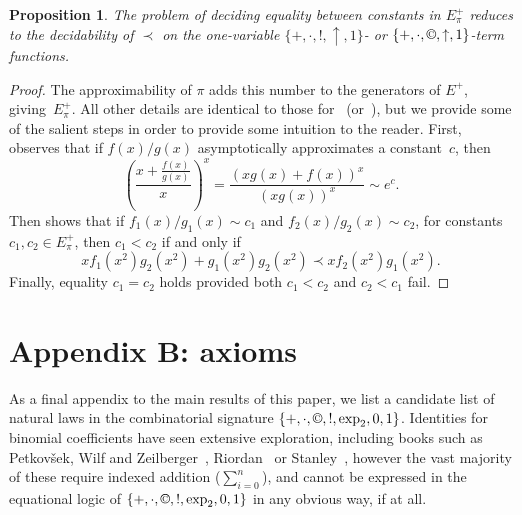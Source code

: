 \documentclass[eqnor,reqno]{amsart}
\theoremstyle{plain}
\newtheorem{pro}[thm]{Proposition}
\theoremstyle{definition}
\newcommand{\cc}{\mathbin{\textup{\copyright}}}
\begin{document}
\begin{pro}\label{pro:Richardson}
The problem of deciding equality between constants in $E_\pi^+$ reduces to the decidability of $\prec$ on the one-variable $\{+,\cdot,!,\uparrow,1\}$- or $\{+,\cdot,\cc,\uparrow,1\}$-term functions.
\end{pro}
\begin{proof}
The approximability of $\pi$ adds this number to the generators of $E^+$, giving~$E_\pi^+$.  All other details are identical to those for~\cite[Theorems~7,8]{ric} (or~\cite[Proposition~2.1]{gur86}), but we provide some of the salient steps in order to provide some  intuition to the reader. 
First, \cite[Theorem~7]{ric} observes that if $f(x)/g(x)$ asymptotically approximates a constant~$c$, then 
\[
\left(\frac{x+\frac{f(x)}{g(x)}}{x}\right)^x=\frac{(xg(x)+f(x))^x}{(xg(x))^x}\sim e^c.
\] 
Then \cite[Theorem~8]{ric} shows that if $f_1(x)/g_1(x)\sim c_1$ and $f_2(x)/g_2(x)\sim c_2$, for constants $c_1,c_2\in E_\pi^+$, then $c_1<c_2$ if and only if 
\[
xf_1(x^2)g_2(x^2)+g_1(x^2)g_2(x^2)\prec xf_2(x^2)g_1(x^2).
\]
Finally, equality $c_1=c_2$ holds provided both $c_1<c_2$ and $c_2<c_1$ fail.
\end{proof}

\section*{Appendix B: axioms}
As a final appendix to the main results of this paper, we list a candidate list of natural laws in the combinatorial signature 
$\{+,\cdot,\cc,!,\exp_2,0,1\}$.  Identities for binomial coefficients have seen extensive exploration, including  books such as Petkov\v{s}ek, Wilf and Zeilberger~\cite{PWZ}, Riordan~\cite{rio} or Stanley~\cite{sta}, however the vast majority of these  require indexed addition ($\sum_{i=0}^n$), and cannot be expressed in the equational logic of $\{+,\cdot,\cc,!,\exp_2,0,1\}$ in any obvious way, if at all.
\end{document}

